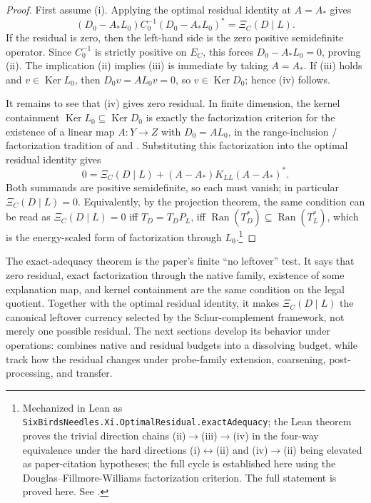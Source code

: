 \documentclass[11pt]{article}
\DeclareMathOperator{\Ran}{Ran}
\DeclareMathOperator{\Ker}{Ker}
\theoremstyle{definition}
\begin{document}
\begin{proof}
First assume (i).  Applying the optimal residual identity at \(A=A_*\) gives
\[
  (D_0-A_*L_0)C_0^{-1}(D_0-A_*L_0)^*
  =
  \Xi_C(D\mid L).
\]
If the residual is zero, then the left-hand side is the zero positive
semidefinite operator.  Since \(C_0^{-1}\) is strictly positive on \(E_C\), this
forces \(D_0-A_*L_0=0\), proving (ii).  The implication (ii) implies (iii) is
immediate by taking \(A=A_*\).  If (iii) holds and \(v\in\Ker L_0\), then
\(D_0v=AL_0v=0\), so \(v\in\Ker D_0\); hence (iv) follows.

It remains to see that (iv) gives zero residual.  In finite dimension, the
kernel containment \(\Ker L_0\subseteq\Ker D_0\) is exactly the factorization
criterion for the existence of a linear map \(A\colon Y\to Z\) with
\(D_0=AL_0\), in the range-inclusion / factorization tradition of
\citet{Douglas1966Majorization} and \citet{FillmoreWilliams1971OperatorRanges}.  Substituting this factorization into the optimal residual
identity gives
\[
  0
  =
  \Xi_C(D\mid L)
  +(A-A_*)K_{LL}(A-A_*)^*.
\]
Both summands are positive semidefinite, so each must vanish; in particular
\(\Xi_C(D\mid L)=0\).  Equivalently, by the projection theorem, the same
condition can be read as
\(\Xi_C(D\mid L)=0\) iff \(T_D=T_DP_L\), iff
\(\Ran(T_D^*)\subseteq\Ran(T_L^*)\), which is the energy-scaled form of
factorization through \(L_0\).\footnote{Mechanized in Lean as \texttt{SixBirdsNeedles.Xi.OptimalResidual.exactAdequacy}; the Lean theorem proves the trivial direction chains (ii)\(\to\)(iii)\(\to\)(iv) in the four-way equivalence under the hard directions (i)\(\leftrightarrow\)(ii) and (iv)\(\to\)(ii) being elevated as paper-citation hypotheses; the full cycle is established here using the Douglas--Fillmore-Williams factorization criterion.  The full statement is proved here.  See .}
\end{proof}

The exact-adequacy theorem is the paper's finite ``no leftover'' test.  It says
that zero residual, exact factorization through the native family, existence of
some explanation map, and kernel containment are the same condition on the
legal quotient.  Together with the optimal residual identity, it makes
\(\Xi_C(D\mid L)\) the canonical leftover currency selected by the
Schur-complement framework, not merely one possible residual.  The next
sections develop its behavior under operations:  combines
native and residual budgets into a dissolving budget, while
 track how the residual changes under
probe-family extension, coarsening, post-processing, and transfer.
\end{document}
